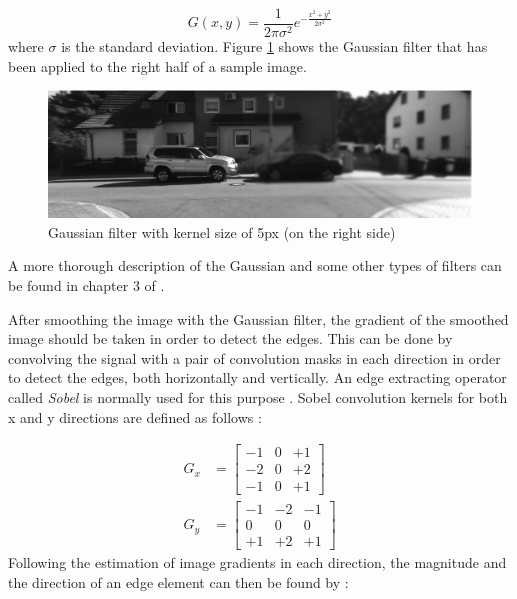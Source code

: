 \begin{equation}
G(x,y)=\frac{1}{2\pi \sigma ^{2}} e^{-\frac{x^{2}+y^{2}}{2\sigma^{2}}}
\end{equation}
where $\sigma$ is the standard deviation. 
Figure \ref{fig:gauss} shows the Gaussian filter that has been applied to the right half of a sample image.

\begin{figure}[H]
\centering
\includegraphics[scale=0.43]{left5Gblur}
\caption{Gaussian filter with kernel size of 5px (on the right side)}
\label{fig:gauss}
\end{figure} 


A more thorough description of the Gaussian and some other types of filters can be found in chapter 3 of \cite{sze11}.

After smoothing the image with the Gaussian filter, the gradient of the smoothed image should be taken in order to detect the edges. This can be done by convolving 
the signal with a pair of convolution masks in each direction in order to detect the edges, both horizontally and vertically. An edge extracting operator called {\it Sobel} is normally used
for this purpose \cite{sobel78}. 
Sobel convolution kernels for both x and y directions are defined as follows \cite{sobel78}:

\begin{align}
G_{x} &= \begin{bmatrix}
-1 & 0 & +1 \\ 
-2 & 0 & +2 \\ 
-1 & 0 & +1
\end{bmatrix} \\
G_{y} &= \begin{bmatrix}
-1 & -2 & -1 \\ 
0 & 0 & 0 \\ 
+1 & +2 & +1
\end{bmatrix}
\end{align} \newline
Following the estimation of image gradients in each direction, the magnitude and the direction of an edge element can then be found by \cite{sze11}:

